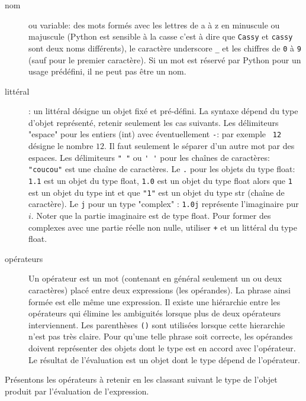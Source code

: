 \begin{description}
 \item[nom] ou variable: des mots formés avec les lettres de a à z en minuscule ou majuscule (Python est sensible à la casse c'est à dire que \verb|Cassy| et \verb|cassy| sont deux noms différents), le caractère underscore \verb|_| et les chiffres de \verb|0| à \verb|9| (sauf pour le premier caractère). Si un mot est réservé par Python pour un usage prédéfini, il ne peut pas être un nom.
 \item[littéral] : un littéral désigne un objet fixé et pré-défini. La syntaxe dépend du type d'objet représenté, retenir seulement les cas suivants.\newline
Les délimiteurs "espace" pour les entiers (int) avec éventuellement \verb|-|: par exemple \verb| 12 | désigne le nombre $12$. Il faut seulement le séparer d'un autre mot par des espaces.\newline
Les délimiteurs \verb|" "| ou \verb|' '| pour les chaînes de caractères: \verb|"coucou"| est une chaîne de caractères.\newline
Le \verb|.| pour les objets du type float: \verb|1.1| est un objet du type float, \verb|1.0| est un objet du type float alors que \verb|1| est un objet du type int et que \verb|"1"| est un objet du type str (chaîne de caractère).\newline
Le \verb|j| pour un type "complex" : \verb|1.0j| représente l'imaginaire pur $i$. Noter que la partie imaginaire est de type float. Pour former des complexes avec une partie réelle non nulle, utiliser \verb|+| et un littéral du type float.

\item[opérateurs] Un opérateur est un mot (contenant en général seulement un ou deux caractères) placé entre deux expressions (les opérandes). La phrase ainsi formée est elle même une expression. Il existe une hiérarchie entre les opérateurs qui élimine les ambiguités lorsque plus de deux opérateurs interviennent. Les parenthèses \verb|()| sont utilisées lorsque cette hierarchie n'est pas très claire. Pour qu'une telle phrase soit correcte, les opérandes doivent représenter des objets dont le type est en accord avec l'opérateur. Le résultat de l'évaluation est un objet dont le type dépend de l'opérateur.  
\end{description}
Présentons les opérateurs à retenir en les classant suivant le type de l'objet produit par l'évaluation de l'expression.
